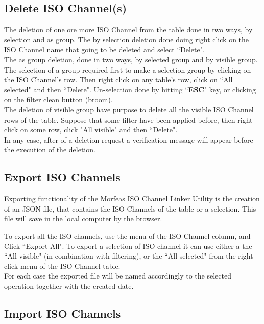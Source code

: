 \newpage
\subsection{Delete ISO Channel(s)}
The deletion of one ore more ISO Channel from the table done in two ways, by selection and as group.
The by selection deletion done doing right click on the ISO Channel name that going to be deleted and select ``Delete".\\

The as group deletion, done in two ways, by selected group and by visible group.
The selection of a group required first to make a selection group by clicking on the ISO Channel's row.
Then right click on any table's row, click on ``All selected" and then ``Delete".
Un-selection done by hitting ``\textbf{ESC}" key, or clicking on the filter clean button (broom).\\

The deletion of visible group have purpose to delete all the visible ISO Channel rows of the table.
Suppose that some filter have been applied before, then right click on some row, click "All visible" and then ``Delete".\\

In any case, after of a deletion request a verification message will appear before the execution of the deletion.

\subsection{Export ISO Channels}
Exporting functionality of the Morfeas ISO Channel Linker Utility is the creation of an JSON file,
that contains the ISO Channels of the table or a selection. This file will save in the local computer by the browser.

To export all the ISO channels, use the menu of the ISO Channel column, and Click ``Export All".
To export a selection of ISO channel it can use either a the ``All visible" (in combination with filtering), 
or the ``All selected" from the right click menu of the ISO Channel table.\\ 

For each case the exported file will be named accordingly to the selected operation together with the created date.

\subsection{Import ISO Channels}